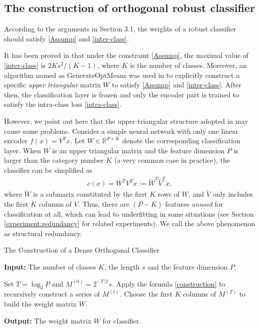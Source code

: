 \documentclass[preprint,review,12pt]{elsarticle}
\numberwithin{equation}{section}
\begin{document}
	
\subsection{The construction of orthogonal robust classifier}
\label{sec:construction}
According to the arguments in Section 3.1,
the weights of a robust classifier should satisfy \eqref{Assump} and \eqref{inter-class}.
	
It has been proved in  \cite{pang2018} that under the constraint  \eqref{Assump},
the maximal value of \eqref{inter-class} is  $ 2K s^2/(K-1) $,
where $ K $ is the number of classes.
Moreover,
an algorithm named as GenerateOptMeans was used in  \cite{pang2018,pang2020}
to explicitly construct a specific \emph{upper triangular} matrix $W $ to satisfy \eqref{Assump} and \eqref{inter-class}.
After then, the classification layer is frozen  and only the encoder part is trained to satisfy the intra-class loss \eqref{intra-class}.

However, we point out here that the upper triangular structure adopted in \cite{pang2018,pang2020} may cause some problems.
Consider a simple neural network with only one linear encoder $ f(x) =V^T x $.
Let $ W \in \mathbb{R}^{P \times K} $ denote the corresponding classification layer.
When  $ W $  is an upper triangular matrix and the feature dimension $ P $ is larger than the category number $ K $ (a very common case in practice),
the classifier can be simplified as
\begin{align*}
		c(x) = W^T V^T x:=\widetilde{W}^T \widetilde{V}^T x,
\end{align*}
where $\widetilde{W}$ is a submarix constituted by the first $ K $ rows of $ W $,
and $\widetilde{V}$ only includes the first $ K $  columns of $ V $.
Thus, there are  $ (P-K) $ features \emph{ unused} for classification at all,
which can lead to underfitting  in some situations (see Section \ref{experiment:redundancy} for related experiments).
We call the above phenomenon as structural redundancy.
	
	\begin{algorithm}[htb]
   		\caption{The Construction of a Dense Orthogonal Classifier}
        \label{alg:constrution}
		{\bf Input:}  The number of classes $ K $,  the length $ s $ and the feature dimension $P$.
		\begin{algorithmic}
			\State Set $ T = \log_2 P $ and $ M^{(0)} = 2^{-T/2} s $.
			\State Apply the formula \eqref{construction} to recursively construct a series of $ M^{(t)} $.
			\EndFor
			\State Choose the first $ K $ columns of $ M^{(T)}$  to build the weight matrix $ W $.
		\end{algorithmic}
		{\bf Output:} The weight matrix $ W $ for classifier.
	\end{algorithm}
\end{document}
